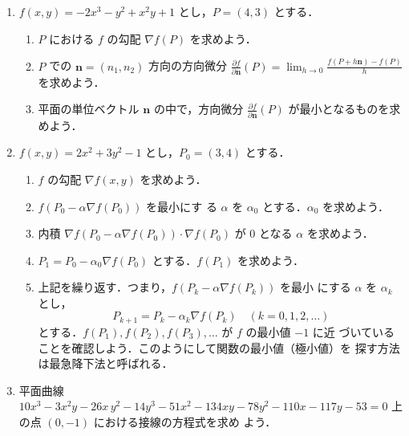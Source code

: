 \documentclass[11pt, uplatex, dvipdfmx, twoside]{jsarticle}
\newcommand{\ds}{\displaystyle}
\begin{document}
\begin{enumerate}[label=\arabic{section}.\arabic*]

  \setlength{\itemsep}{1zh}
  
\item $f(x,y) = -2x^3-y^2+x^2y+1$ とし，$\ds P=(4,3)$ とする．

  \vspace{1ex}

  \begin{enumerate}[label=(\arabic*)]
    \setlength{\itemsep}{1ex}
    
  \item $P$ における $f$ の勾配 $\nabla f(P)$ を求めよう．

  \item $P$ での $\bm{n} = (n_1, n_2)$ 方向の方向微分
    $\ds \frac{\partial f}{\partial \bm{n}}(P) = \lim_{h \to 0}
    \frac{f(P+h\bm{n}) - f(P)}{h}$ を求めよう．

  \item 平面の単位ベクトル $\bm{n}$ の中で，方向微分
    $\ds \frac{\partial f}{\partial \bm{n}}(P)$ が最小となるものを求めよう．
  \end{enumerate}

\item $f(x,y) = 2x^2+3y^2-1$ とし，$P_0=(3,4)$ とする．

  \vspace{1ex}
  
  \begin{enumerate}[label=(\arabic*)]
    \setlength{\itemsep}{1ex}
    
  \item $f$ の勾配 $\nabla f(x,y)$ を求めよう．

  \item $f(P_0 - \alpha \nabla f(P_0))$ を最小にす
    る $\alpha$ を $\alpha_0$ とする．$\alpha_0$ を求めよう．

  \item 内積
    $\nabla f\left(P_0 - \alpha \nabla f(P_0)\right) \cdot \nabla
    f(P_0)$ が $0$ となる $\alpha$ を求めよう．

  \item $P_1 = P_0  - \alpha_0 \nabla f(P_0)$ とする．$f(P_1)$ を求めよう．

  \item 上記を繰り返す．つまり，$f(P_k - \alpha \nabla f(P_k))$ を最小
    にする $\alpha$ を $\alpha_k$
    とし，
    \[
      P_{k+1} = P_{k} - \alpha_k \nabla f(P_k) \quad (k=0,1,2,\ldots)
    \]
    とする．$f(P_1), f(P_2), f(P_3), \ldots $ が $f$ の最小値 $-1$ に近
    づいていることを確認しよう．このようにして関数の最小値（極小値）を
    探す方法は最急降下法と呼ばれる．
  \end{enumerate}

\item 平面曲線
  $ 10 x^{3}-3 x^{2} y -26 x \,y^{2}-14 y^{3}-51 x^{2}-134 x y -78
  y^{2}-110 x -117 y -53=0$ 上の点 $(0,-1)$ における接線の方程式を求め
  よう．
  
\end{enumerate}
\end{document}
